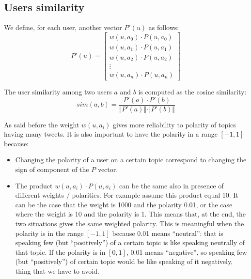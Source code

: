 \documentclass[a4paper,11pt,oneside]{article}
\begin{document}
\subsection{Users similarity}
We define, for each user, another vector $P'(u)$ as follows:
\begin{equation}
P'(u) = \left[  \begin{array}{c}
w(u,a_0) \cdot P(u,a_0) \\ 
w(u,a_1)  \cdot P(u,a_1) \\ 
w(u,a_2)  \cdot P(u,a_2) \\ 
\vdots \\ 
w(u,a_n) \cdot P(u,a_n)
\end{array}\right]
\end{equation}

The user similarity among two users $a$ and $b$ is computed as the cosine similarity:
\begin{equation}
sim(a,b) = \frac{P'(a) \cdot P'(b)}{\Vert P'(a)\Vert \cdot \Vert P'(b) \Vert} 
\end{equation}

As said before the weight $w(u,a_i)$ gives more reliability to polarity of topics having many tweets. It is also important to have the polarity in a range $[-1,1]$ because:

\begin{itemize}
\item Changing the polarity of a user on a certain topic correspond to changing the sign of component of the $P$ vector.
\item The product $w(u,a_i) \cdot P(u,a_i)$ can be the same also in presence of different weights / polarities. For example assume this product equal 10. It can be the case that the weight is 1000 and the polarity 0.01, or the case where the weight is 10 and the polarity is 1.
This means that, at the end, the two situations gives the same weighted polarity. This is meaningful when the polarity is in the range $[-1,1]$ because 0.01 means ``neutral'': that is speaking few (but ``positively'') of a certain topic is like speaking neutrally of that topic.
If the polarity is in $[0,1]$, 0.01 means ``negative'', so speaking few (but ``positively'') of certain topic would be like speaking of it negatively, thing that we have to avoid.
\end{itemize}



\end{document}
